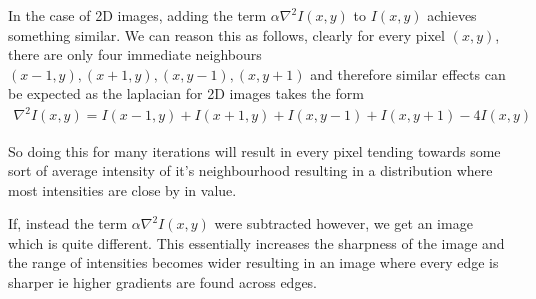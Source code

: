 \documentclass[12pt]{article}
\begin{document}
    In the case of 2D images, adding the term $\alpha \nabla^{2}I(x,y)$ to $I(x,y)$ achieves something similar. We can reason this
    as follows, clearly for every pixel $(x,y)$, there are only four immediate neighbours $(x - 1,y),(x + 1,y),(x,y - 1),(x,y + 1)$
    and therefore similar effects can be expected as the laplacian for 2D images takes the form
    \begin{align*}
        \nabla^{2} I(x,y) = I(x - 1,y) + I(x + 1,y) + I(x,y - 1) + I(x,y + 1) - 4I(x,y)
    \end{align*}

    So doing this for many iterations will result in every pixel tending towards some sort of average intensity of 
    it's neighbourhood resulting in a distribution where most intensities are close by in value.

    If, instead the term $\alpha \nabla^{2} I(x,y)$ were subtracted however, we get an image which is quite different. This 
    essentially increases the sharpness of the image and the range of intensities becomes wider resulting in an image where
    every edge is sharper ie higher gradients are found across edges. 
\end{document}
